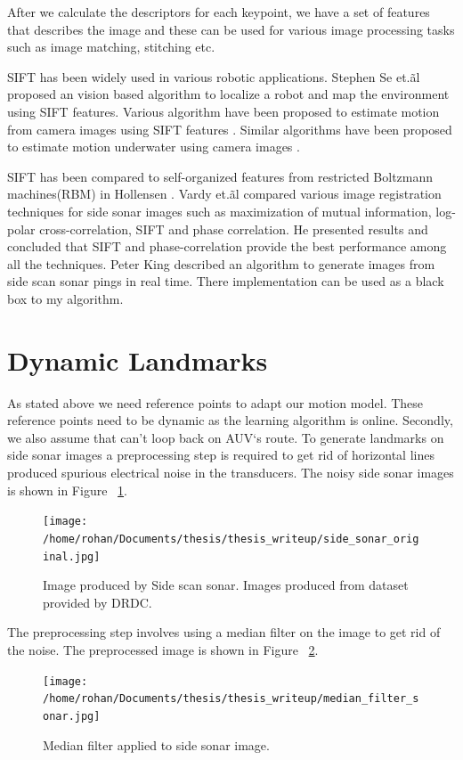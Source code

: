 \documentclass[12pt]{dalcsthesis}
\begin{document}
After we calculate the descriptors for each keypoint, we have a set of features that describes the image and these can be used for various image processing tasks such as image matching, stitching etc. 

SIFT has  been widely used in various robotic applications. Stephen Se et.\~al \cite{se2001vision} proposed an vision based algorithm to localize a robot and map the environment using SIFT features. Various algorithm have been proposed to estimate motion from camera images using SIFT features \cite{barfoot2005online} \cite{scaramuzza2008appearance}. Similar algorithms have been proposed to estimate motion underwater using camera images \cite{Silva}.

SIFT has been compared to self-organized features from restricted Boltzmann machines(RBM) in Hollensen \cite{hollesen2011comparison}. Vardy et.\~al \cite{vandrish2011side} compared various image registration techniques for side sonar images such as  maximization of mutual information, log-polar cross-correlation, SIFT and phase correlation. He presented results and concluded that SIFT and phase-correlation provide the best performance among all the techniques. Peter King \cite{king2012real} described an algorithm to generate images from side scan sonar pings in real time. There implementation can be used as a black box to my algorithm.


\section{Dynamic Landmarks}
\label{ch-: dynamic landmarks}

As stated above we need reference points to adapt our motion model. These reference points need to be dynamic as the learning algorithm is online. Secondly, we also assume that can't loop back on AUV`s route. To generate landmarks on side sonar images a preprocessing step is required to get rid of horizontal lines produced spurious electrical noise in the transducers. The noisy side sonar images is shown in Figure ~\ref{fig- side sonar image original}.

\begin{figure}
  \centering
     {\texttt{[image: /home/rohan/Documents/thesis/thesis\_writeup/side\_sonar\_original.jpg]}}
  \caption{\label{fig- side sonar image original} Image produced by Side scan sonar. Images produced from dataset provided by DRDC.}
\end{figure}


The preprocessing step involves using a median filter on the image to get rid of the noise. The preprocessed image is shown in Figure ~\ref{fig- side sonar median}.
\begin{figure}
  \centering
     {\texttt{[image: /home/rohan/Documents/thesis/thesis\_writeup/median\_filter\_sonar.jpg]}}
  \caption{\label{fig- side sonar median} Median filter applied to side sonar image.}
\end{figure}
\end{document}
